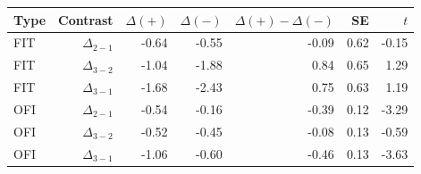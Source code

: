 \begin{tabular}{lrrrrrr}
\toprule
Type & Contrast & $\Delta(+)$ & $\Delta(-)$ & $\Delta(+) - \Delta(-)$ & SE & $t$ \\
\midrule
FIT & $\Delta_{2-1}$ & -0.64 & -0.55 & -0.09 & 0.62 & -0.15 \\
FIT & $\Delta_{3-2}$ & -1.04 & -1.88 & 0.84 & 0.65 & 1.29 \\
FIT & $\Delta_{3-1}$ & -1.68 & -2.43 & 0.75 & 0.63 & 1.19 \\
\addlinespace
OFI & $\Delta_{2-1}$ & -0.54 & -0.16 & -0.39 & 0.12 & -3.29 \\
OFI & $\Delta_{3-2}$ & -0.52 & -0.45 & -0.08 & 0.13 & -0.59 \\
OFI & $\Delta_{3-1}$ & -1.06 & -0.60 & -0.46 & 0.13 & -3.63 \\
\bottomrule
\end{tabular}
